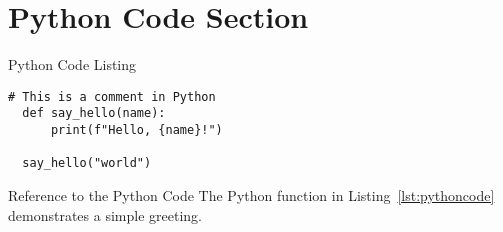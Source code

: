 \section{Python Code Section}
\label{python_code_section}

\begin{frame}[fragile]{Python Code Listing}
    \begin{lstlisting}[caption={Sample Python Code}, label=lst:pythoncode]
  # This is a comment in Python
  def say_hello(name):
      print(f"Hello, {name}!")
  
  say_hello("world")
    \end{lstlisting}
  \end{frame}
  
  \begin{frame}{Reference to the Python Code}
    The Python function in Listing~\ref{lst:pythoncode} demonstrates a simple greeting.
  \end{frame}
  